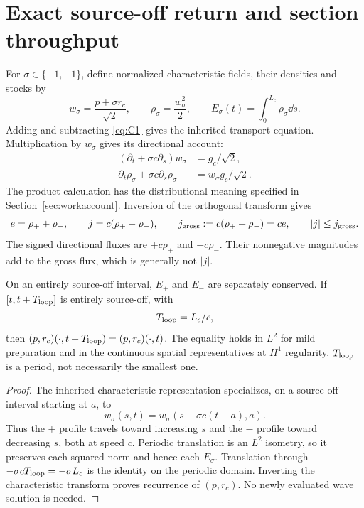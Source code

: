 \section{Exact source-off return and section throughput}\label{sec:return}
For $\sigma\in\{+1,-1\}$, define normalized characteristic fields, their densities and stocks by
\begin{equation}\label{eq:chars}
 w_\sigma=\frac{p+\sigma r_c}{\sqrt2},\qquad
 \rho_\sigma=\frac{w_\sigma^2}{2},\qquad
 E_\sigma(t)=\int_0^{L_c}\rho_\sigma\dd s.
\end{equation}
Adding and subtracting \eqref{eq:C1} gives the inherited transport equation. Multiplication by $w_\sigma$ gives its directional account:
\begin{align}
 (\partial_t+\sigma c\partial_s)w_\sigma&=g_c/\sqrt2,\label{eq:transport}\\
 \partial_t\rho_\sigma+\sigma c\partial_s\rho_\sigma
 &=w_\sigma g_c/\sqrt2.\label{eq:directional}
\end{align}
The product calculation has the distributional meaning specified in Section~\ref{sec:workaccount}. Inversion of the orthogonal transform gives
\begin{equation}\label{eq:netgross}
 e=\rho_++\rho_-,\qquad
 j=c(\rho_+-\rho_-),\qquad
 j_{\rm gross}:=c(\rho_++\rho_-)=ce,\qquad |j|\le j_{\rm gross}.
\end{equation}
The signed directional fluxes are $+c\rho_+$ and $-c\rho_-$. Their nonnegative magnitudes add to the gross flux, which is generally not $|j|$.

\begin{theorem}\label{thm:return}
On an entirely source-off interval, $E_+$ and $E_-$ are separately conserved. If $[t,t+T_{\rm loop}]$ is entirely source-off, with
\begin{equation}\label{eq:period}
 T_{\rm loop}=L_c/c,
\end{equation}
then $(p,r_c)(\cdot,t+T_{\rm loop})=(p,r_c)(\cdot,t)$. The equality holds in $L^2$ for mild preparation and in the continuous spatial representatives at $H^1$ regularity. $T_{\rm loop}$ is a period, not necessarily the smallest one.
\end{theorem}
\begin{proof}
The inherited characteristic representation \cite[well-posedness theorem]{pairedII} specializes, on a source-off interval starting at $a$, to
\begin{equation}\label{eq:translation}
 w_\sigma(s,t)=w_\sigma(s-\sigma c(t-a),a).
\end{equation}
Thus the $+$ profile travels toward increasing $s$ and the $-$ profile toward decreasing $s$, both at speed $c$. Periodic translation is an $L^2$ isometry, so it preserves each squared norm and hence each $E_\sigma$. Translation through $-\sigma cT_{\rm loop}=-\sigma L_c$ is the identity on the periodic domain. Inverting the characteristic transform proves recurrence of $(p,r_c)$. No newly evaluated wave solution is needed.
\end{proof}

